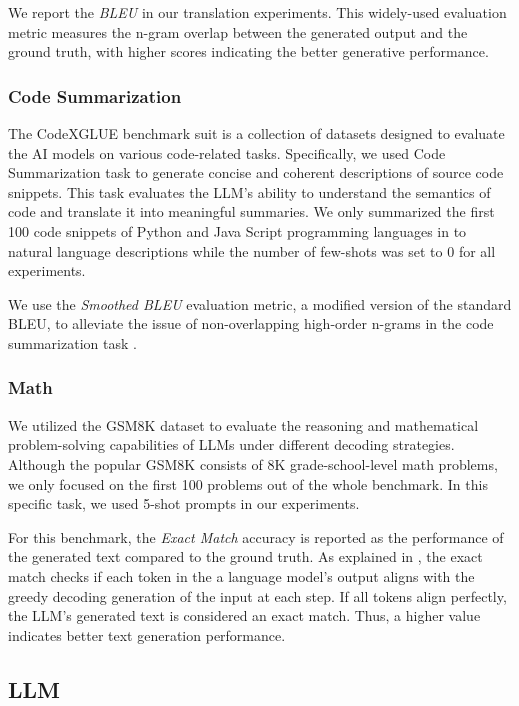 We report the \textit{BLEU} \cite{bleu} in our translation experiments. This widely-used evaluation metric measures the n-gram overlap between the generated output and the ground truth, with higher scores indicating the better generative performance. 

\subsubsection{Code Summarization}

The CodeXGLUE \cite{codexglue} benchmark suit is a collection of datasets designed to evaluate the AI models on various code-related tasks. Specifically, we used Code Summarization \cite{codesearchnet} task to generate concise and coherent descriptions of source code snippets. This task evaluates the LLM's ability to understand the semantics of code and translate it into meaningful summaries. We only summarized the first 100 code snippets of Python and Java Script programming languages in to natural language descriptions while the number of few-shots was set to 0 for all experiments. 

We use the \textit{Smoothed BLEU} \cite{smoothed} evaluation metric, a modified version of the standard BLEU, to alleviate the issue of non-overlapping high-order n-grams in the code summarization task \cite{codexglue}. 

\subsubsection{Math} 

We utilized the GSM8K dataset \cite{gsm8k} to evaluate the reasoning and mathematical problem-solving capabilities of LLMs under different decoding strategies. Although the popular GSM8K consists of 8K grade-school-level math problems, we only focused on the first 100 problems out of the whole benchmark. In this specific task, we used 5-shot prompts in our experiments. 

For this benchmark, the \textit{Exact Match} accuracy is reported as the performance of the generated text compared to the ground truth. As explained in \cite{lessons}, the exact match checks if each token in the a language model's output aligns with the greedy decoding generation of the input at each step. If all tokens align perfectly, the LLM's generated text is considered an exact match. Thus, a higher value indicates better text generation performance.


\subsection{LLM} 

